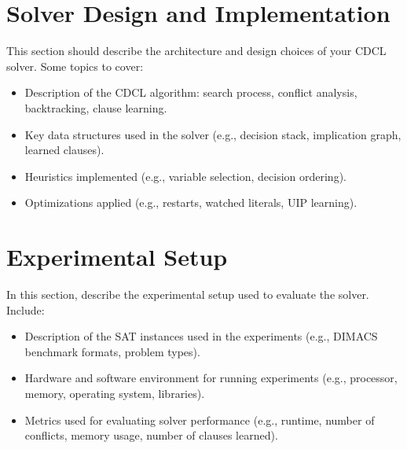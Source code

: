 \documentclass[a4paper,12pt]{article}
\begin{document}

\section{Solver Design and Implementation}
\label{sec:design}
This section should describe the architecture and design choices of your CDCL solver. Some topics to cover:
\begin{itemize}
    \item Description of the CDCL algorithm: search process, conflict analysis, backtracking, clause learning.
    \item Key data structures used in the solver (e.g., decision stack, implication graph, learned clauses).
    \item Heuristics implemented (e.g., variable selection, decision ordering).
    \item Optimizations applied (e.g., restarts, watched literals, UIP learning).
\end{itemize}

\section{Experimental Setup}
\label{sec:experiment}
In this section, describe the experimental setup used to evaluate the solver. Include:
\begin{itemize}
    \item Description of the SAT instances used in the experiments (e.g., DIMACS benchmark formats, problem types).
    \item Hardware and software environment for running experiments (e.g., processor, memory, operating system, libraries).
    \item Metrics used for evaluating solver performance (e.g., runtime, number of conflicts, memory usage, number of clauses learned).
\end{itemize}
\end{document}
